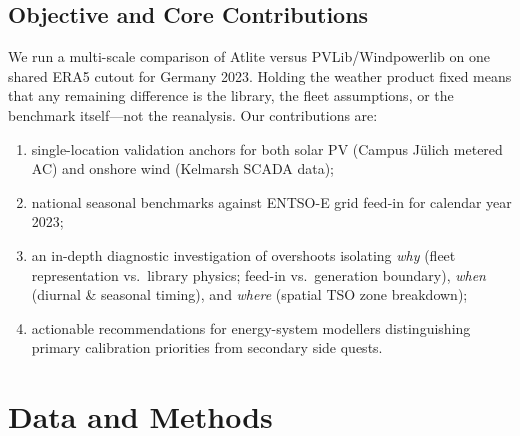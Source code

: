\documentclass[preprint,12pt,number]{elsarticle}
\begin{document}
\subsection{Objective and Core Contributions}
We run a multi-scale comparison of Atlite versus PVLib/Windpowerlib on one shared ERA5 cutout for Germany 2023.
Holding the weather product fixed means that any remaining difference is the library, the fleet assumptions, or the benchmark itself---not the reanalysis.
Our contributions are:
\begin{enumerate}
    \item single-location validation anchors for both solar PV (Campus Jülich metered AC) and onshore wind (Kelmarsh SCADA data);
    \item national seasonal benchmarks against ENTSO-E grid feed-in for calendar year 2023;
    \item an in-depth diagnostic investigation of overshoots isolating \emph{why} (fleet representation vs.\ library physics; feed-in vs.\ generation boundary), \emph{when} (diurnal \& seasonal timing), and \emph{where} (spatial TSO zone breakdown);
    \item actionable recommendations for energy-system modellers distinguishing primary calibration priorities from secondary side quests.
\end{enumerate}

\section{Data and Methods}
\label{sec:methods}
\end{document}
